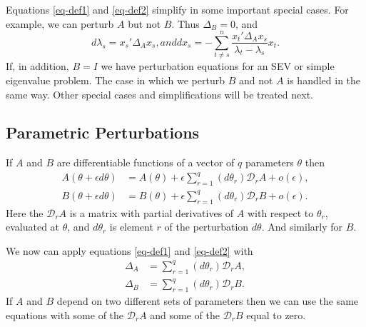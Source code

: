 \documentclass[
  12pt,
  letterpaper,
  DIV=11,
  numbers=noendperiod]{scrartcl}
\begin{document}
Equations \eqref{eq-def1} and \eqref{eq-def2} simplify in some important
special cases. For example, we can perturb \(A\) but not \(B\). Thus
\(\Delta_B=0\), and \begin{subequations}
\begin{equation}
d\lambda_s=x_s'\Delta_Ax_s\label{eq-sim1},
\end{equation}
and
\begin{equation}
dx_s=-\sum_{t\not= s}^n\frac{x_t'\Delta_Ax_s}{\lambda_t-\lambda_s}x_t.\label{eq-sim2}
\end{equation}
\end{subequations} If, in addition, \(B=I\) we have perturbation
equations for an SEV or simple eigenvalue problem. The case in which we
perturb \(B\) and not \(A\) is handled in the same way. Other special
cases and simplifications will be treated next.

\subsection{Parametric Perturbations}\label{sec-parametric}

If \(A\) and \(B\) are differentiable functions of a vector of \(q\)
parameters \(\theta\) then \begin{subequations}
\begin{align}
A(\theta+\epsilon d\theta)&=A(\theta)+\epsilon\sum_{r=1}^q (d\theta_r)\mathcal{D}_rA+o(\epsilon),\label{eq-par1}\\
B(\theta+\epsilon d\theta)&=B(\theta)+\epsilon\sum_{r=1}^q (d\theta_r)\mathcal{D}_rB+o(\epsilon).\label{eq-par2}
\end{align}
\end{subequations} Here the \(\mathcal{D}_rA\) is a matrix with partial
derivatives of \(A\) with respect to \(\theta_r\), evaluated at
\(\theta\), and \(d\theta_r\) is element \(r\) of the perturbation
\(d\theta\). And similarly for \(B\).

We now can apply equations \eqref{eq-def1} and \eqref{eq-def2} with
\begin{subequations}
\begin{align}
\Delta_A&=\sum_{r=1}^q(d\theta_r)\mathcal{D}_rA,\label{eq-par3}\\
\Delta_B&=\sum_{r=1}^q(d\theta_r)\mathcal{D}_rB.\label{eq-par4}
\end{align}
\end{subequations} If \(A\) and \(B\) depend on two different sets of
parameters then we can use the same equations with some of the
\(\mathcal{D}_rA\) and some of the \(\mathcal{D}_rB\) equal to zero.
\end{document}
